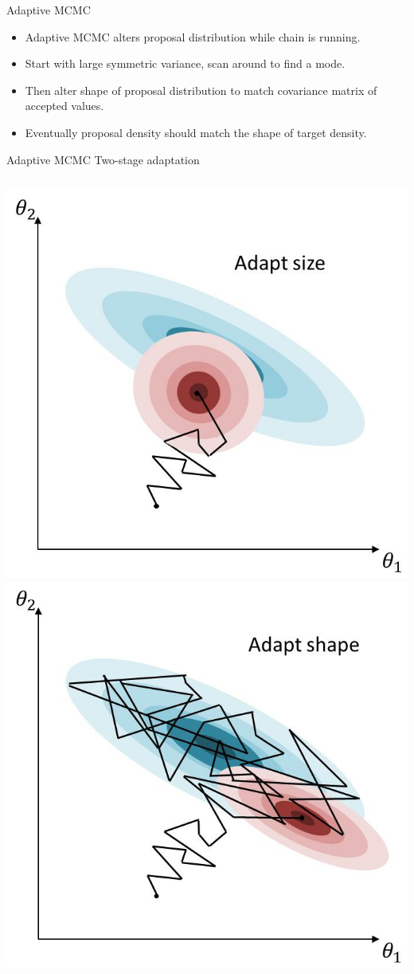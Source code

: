 \documentclass[compress]{beamer}
\begin{document}
\begin{frame}[label=sec-8-7]{Adaptive MCMC}
\begin{itemize}
\item \alert{Adaptive MCMC} alters proposal distribution while chain is running. 
\item Start with large symmetric variance, scan around to find a mode. 
\item Then alter shape of proposal distribution to match covariance matrix of accepted values.
\item Eventually proposal density should match the shape of target density.
\end{itemize}
\end{frame}

\begin{frame}[label=sec-8-8]{Adaptive MCMC}
Two-stage adaptation
\begin{columns}[c] 
\includegraphics[width=.8\linewidth]{MH7.jpg}
\includegraphics[width=.8\linewidth]{MH8.jpg}
\end{columns}
\end{frame}
\end{document}
